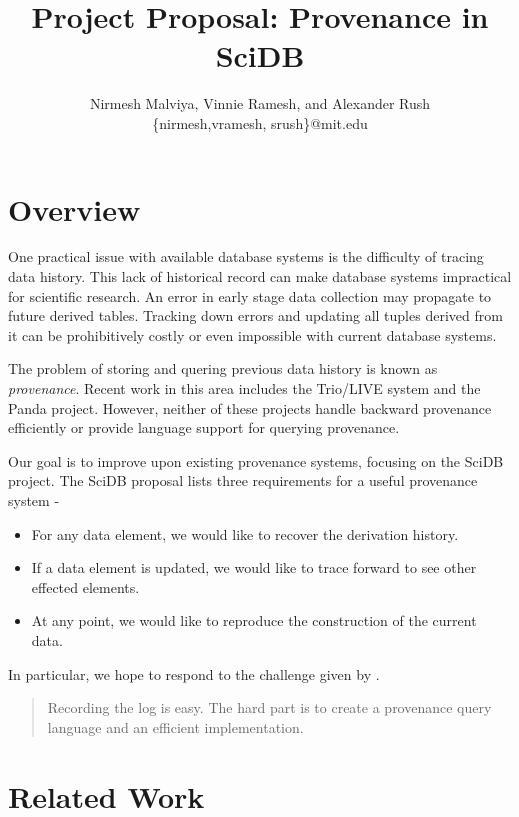 \documentclass{article}
\title{Project Proposal: Provenance in SciDB}
\author{Nirmesh Malviya, Vinnie Ramesh, and Alexander Rush\\ \{nirmesh,vramesh, srush\}@mit.edu}
\date{}
\begin{document}
\maketitle


\section{Overview}

One practical issue with available database systems is the difficulty of tracing data history. This lack of historical record can make database systems impractical for scientific research. An error in early stage data collection may propagate to future derived tables. Tracking down errors and updating all tuples derived from it can be prohibitively costly or even impossible with current database systems. 

The problem of storing and quering previous data history is known as \emph{provenance}. Recent work in this area includes the Trio/LIVE system and the Panda project. However, neither of these projects handle backward provenance efficiently or provide language support for querying provenance.

Our goal is to improve upon existing provenance systems, focusing on the SciDB project. The SciDB proposal \cite{stonebraker9requirements} lists three requirements for a useful provenance system -

\begin{itemize}
\item For any data element, we would like to recover the derivation history. 
\item If a data element is updated, we would like to trace forward to see other effected elements.
\item At any point, we would like to reproduce the construction of the current data. 
\end{itemize}


In particular, we hope to respond to the challenge given by \cite{cudré2009demonstration}.


\begin{quote}
Recording the log is easy. The hard part is to create a provenance query language and an efficient implementation.  
\end{quote}


\section{Related Work}
\end{document}
